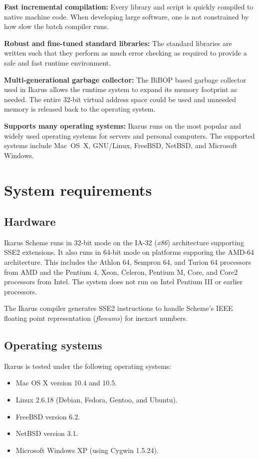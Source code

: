 \documentclass[onecolumn, 12pt, twoside, openright, dvipdfm]{book}
\begin{document}
\textbf{Fast incremental compilation:}  Every library and script is
quickly compiled to native machine code.  When developing large
software, one is not constrained by how slow the batch compiler
runs.

\textbf{Robust and fine-tuned standard libraries:}  The standard
libraries are written such that they perform as much error checking
as required to provide a safe and fast runtime environment. 

\textbf{Multi-generational garbage collector:} The
BiBOP\cite{dybvig:sm} based garbage collector used in Ikarus allows
the runtime system to expand its memory footprint as needed.  The
entire 32-bit virtual address space could be used and unneeded
memory is released back to the operating system.

\textbf{Supports many operating systems:} Ikarus runs on the most
popular and widely used operating systems for servers and personal
computers.  The supported systems include Mac~OS~X,
GNU/Linux, FreeBSD, NetBSD, and Microsoft Windows.


\section{System requirements}

\subsection{Hardware}

Ikarus Scheme runs in 32-bit mode on the IA-32 (\emph{x86})
architecture supporting SSE2 extensions.  It also runs in 64-bit
mode on platforms supporing the AMD-64 architecture.  This includes
the Athlon 64, Sempron 64, and Turion 64 processors from AMD and the
Pentium 4, Xeon, Celeron, Pentium M, Core, and Core2 processors from
Intel.  The system does not run on Intel Pentium III or earlier
processors.

The Ikarus compiler generates SSE2 instructions to handle Scheme's
IEEE floating point representation (\emph{flonums}) for inexact
numbers. 

\subsection{Operating systems}

Ikarus is tested under the following operating systems:

\begin{itemize}
\item Mac OS X version 10.4 and 10.5.
\item Linux 2.6.18 (Debian, Fedora, Gentoo, and Ubuntu).
\item FreeBSD version 6.2.
\item NetBSD version 3.1.
\item Microsoft Windows XP (using Cygwin 1.5.24).
\end{itemize}
\end{document}
